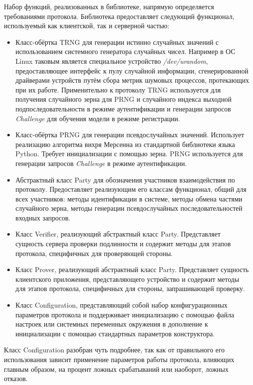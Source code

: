 \clearpage
Набор функций, реализованных в библиотеке, напрямую определяется требованиями протокола. Библиотека предоставляет следующий функционал, используемый как клиентской, так и серверной частью:
\begin{itemize}
  \item Класс-обёртка TRNG для генерации истинно случайных значений с использованием системного генератора случайных чисел. Например в ОС Linux таковым является специальное устройство \emph{/dev/urandom}, предоставляющее интерфейс к пулу случайной информации, сгенерированной драйверами устройств путём сбора метрик шумовых процессов, протекающих при их работе. Применительно к протоколу TRNG используется для получения случайного зерна для PRNG и случайного индекса выходной подпоследовательности в режиме аутентификации и генерации запросов \emph{Challenge} для обучения модели в режиме регистрации.
  \item Класс-обёртка PRNG для генерации псевдослучайных значений. Использует реализацию алгоритма вихря Мерсенна из стандартной библиотеки языка Python. Требует инициализации с помощью зерна. PRNG используется для генерации запросов \emph{Challenge} в режиме аутентификации.
  \item Абстрактный класс Party для обозначения участников взаимодействия по протоколу. Предоставляет реализующим его классам функционал, общий для всех участников: методы идентификации в системе, методы обмена частями случайного зерна, методы генерации псевдослучайных последовательностей входных запросов.
  \item Класс Verifier, реализующий абстрактный класс Party. Представляет сущность сервера проверки подлинности и содержит методы для этапов протокола, специфичных для проверяющей стороны.
  \item Класс Prover, реализующий абстрактный класс Party. Представляет сущность клиентского приложения, представляющего устройство и содержит методы для этапов протокола, специфичных для стороны, запрашивающей проверку.
  \item Класс Configuration, представляющий собой набор конфигурационных параметров протокола и поддерживает инициализацию с помощью файла настроек или системных переменных окружения в дополнение к инициализации с помощью стандартных параметров конструктора.
\end{itemize}

Класс Configuration разобран чуть подробнее, так как от правильного его использования зависит применение параметров работы протокола, влияющих главным образом, на процент ложных срабатываний или наоборот, ложных отказов.
\clearpage


